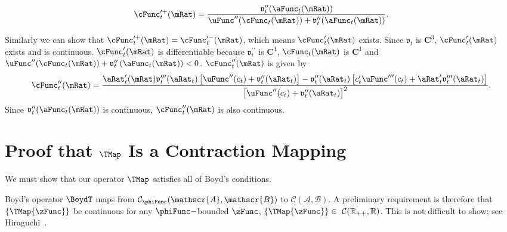 \documentclass[\econtexRoot/BufferStockTheory]{subfiles}
\begin{document}
\begin{equation*}
\cFunc_{t}^{\prime +}(\mRat)=\frac{\mathfrak{v}_{t}^{\prime \prime }({\aFunc}_{t}(\mRat))}{\uFunc^{\prime \prime
}(\cFunc_{t}(\mRat))+\mathfrak{v}_{t}^{\prime \prime }({\aFunc}_{t}(\mRat))}.
\end{equation*}

Similarly we can show that $\cFunc_{t}^{\prime +}(\mRat)=\cFunc_{t}^{\prime -}(\mRat)$,
which means $\cFunc_{t}^{\prime }(\mRat)$ exists. Since $\mathfrak{v}_{t}$ is
$\mathbf{C}^{3}$, $ \cFunc_{t}^{\prime }(\mRat)$ exists and is continuous.
$\cFunc_{t}^{\prime }(\mRat)$ is differentiable because
$\mathfrak{v}_{t}^{\prime \prime }$ is $\mathbf{C}^{1}$, $ \cFunc_{t}(\mRat)$
is $\mathbf{C}^{1}$ and $\uFunc^{\prime \prime
}(\cFunc_{t}(\mRat))+\mathfrak{v}_{t}^{\prime \prime }\left( {\aFunc}_{t}(\mRat)\right)
<0$. $\cFunc_{t}^{\prime \prime }(\mRat)$ is given by
\begin{equation}
\cFunc_{t}^{\prime \prime }(\mRat)=\frac{{\aRat}_{t}^{\prime }(\mRat)\mathfrak{v}_{t}^{\prime \prime
\prime }({\aRat}_{t})\left[ \uFunc^{\prime \prime }(c_{t})+\mathfrak{v}_{t}^{\prime \prime }({\aRat}_{t})
\right] -\mathfrak{v}_{t}^{\prime \prime }({\aRat}_{t})\left[ c_{t}^{\prime }\uFunc^{\prime \prime
\prime }(c_{t})+{\aRat}_{t}^{\prime }\mathfrak{v}_{t}^{\prime \prime \prime }({\aRat}_{t})\right] }{
{\left[ \uFunc^{\prime \prime }(c_{t})+\mathfrak{v}_{t}^{\prime \prime }({\aRat}_{t})\right]}^{2}}.
\end{equation}
Since $\mathfrak{v}_{t}^{\prime \prime }({\aFunc}_{t}(\mRat))$ is continuous,
$\cFunc_{t}^{\prime \prime }(\mRat)$ is also continuous.

\hypertarget{It-Is-A-Contraction-Mapping}{}
\section{Proof that
  \texorpdfstring{$\TMap$}{T} Is a Contraction Mapping}\label{sec:Tcomplete}

We must show that our operator $\TMap$ satisfies all of Boyd's
conditions.

Boyd's operator $\BoydT$ maps from $\mathcal{C}_{\phiFunc}(\mathscr{A},\mathscr{B})$ to $\mathcal{C}(\mathscr{A},\mathscr{B})$. A preliminary requirement is therefore that $\{\TMap{\zFunc}\}$ be continuous for any $\phiFunc-$bounded $\zFunc$, $\{\TMap{\zFunc}\}\in~\mathcal{C}(\mathbb{R}_{++},\mathbb{R})$.  This is not difficult to show; see Hiraguchi~\citeyearpar{hiraguchiBSProofs}.
\end{document}
